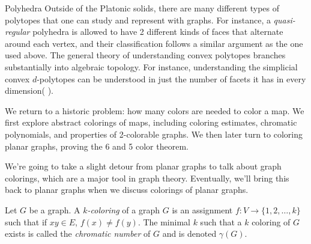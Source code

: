 \begin{projectdescription}{Polyhedra}
  Outside of the Platonic solids, there are many different types of polytopes that one can study and represent with graphs. For instance, a \emph{quasi-regular} polyhedra is allowed to have 2 different kinds of faces that alternate \label{proj:polytope} around each vertex, and their classification follows a similar argument as the one used above. The general theory of understanding convex polytopes branches substantially into algebraic topology. For instance, understanding the simplicial convex $d$-polytopes can be understood in just the number of facets it has in every dimension( \cite{stanley1980number}). 
\end{projectdescription}


\begin{elevator}
We return to a historic problem: how many colors are needed to color a map. We first explore abstract colorings of maps, including coloring estimates, chromatic polynomials, and properties of 2-colorable graphs. We then later turn to coloring planar graphs, proving the 6 and 5 color theorem. 
\end{elevator}
\label{sec:planar:coloring}
We're going to take a slight detour from planar graphs to talk about graph colorings, which are a major tool in graph theory. Eventually, we'll bring this back to planar graphs when we discuss colorings of planar graphs. 
\begin{definition}[Colorings]
 Let $G$ be a graph. A \emph{$k$-coloring} of a graph $G$ is an assignment  $f: V\to \{1,2, \ldots ,k\}$ such that if $xy\in E$, $f(x)\neq f(y)$. The minimal $k$ such that a $k$ coloring of $G$ exists is called the \emph{chromatic number} of $G$ and is denoted $\gamma(G)$. 
\end{definition}

